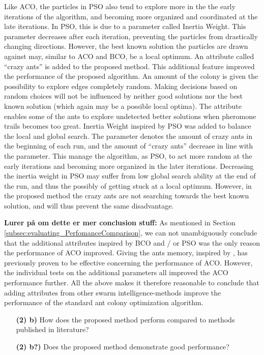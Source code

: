 Like ACO, the particles in PSO also tend to explore more in the the early iterations of the algorithm, and becoming more organized and coordinated at the late iterations. In PSO, this is due to a parameter called  Inertia Weight. This parameter decreases after each iteration, preventing the particles from drastically changing directions. However, the best known solution the particles are drawn against may, similar to ACO and BCO, be a local optimum. An attribute called ``crazy ants'' is added to the proposed method. This additional feature improved the performance of the proposed algorithm. An amount of the colony is given the possibility to explore edges completely random. Making decisions based on random choices will not be influenced by neither good solutions nor the best known solution (which again may be a possible local optima). The attribute enables some of the ants to explore undetected better solutions when pheromone trails becomes too great. Inertia Weight inspired by PSO was added to balance the local and global search. The parameter denotes the amount of crazy ants in the beginning of each run, and the amount of ``crazy ants'' decrease in line with the parameter. This manage the algorithm, as PSO, to act more random at the early iterations and becoming more organized in the later iterations. Decreasing the inertia weight in PSO may suffer from low global search ability at the end of the run, and thus the possibly of getting stuck at a local optimum. However, in the proposed method the crazy ants are not searching towards the best known solution, and will thus prevent the same disadvantage.

\textbf{Lurer på om dette er mer conclusion stuff:}
As mentioned in Section \vref{subsec:evaluating_PerfomanceComparison}, we can not unambiguously conclude that the additional attributes inspired by BCO and / or PSO was the only reason the performance of ACO improved. Giving the ants memory, inspired by \citet{dorigo96}, has previously proven to be effective concerning the performance of ACO. However, the individual tests on the additional parameters all improved the ACO performance further. All the above makes it therefore reasonable to conclude that adding attributes from other swarm intelligence-methods improve the performance of the standard ant colony optimization algorithm.

\begin{itemize}
\item[\textbf{(2) b)}] How does the proposed method perform compared to methods published in literature?
\item[\textbf{(2) b?)}] Does the proposed method demonstrate good performance?
\end{itemize}

